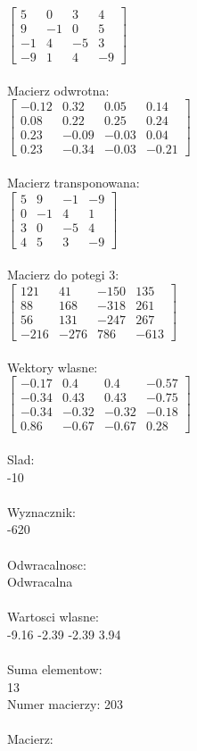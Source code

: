 \documentclass[a4paper,12pt]{article}
\begin{document}
$\begin{bmatrix} 5&0&3&4\\9&-1&0&5\\-1&4&-5&3\\-9&1&4&-9 \end{bmatrix}$
\\
\\
Macierz odwrotna:\\

$\begin{bmatrix} -0.12&0.32&0.05&0.14\\0.08&0.22&0.25&0.24\\0.23&-0.09&-0.03&0.04\\0.23&-0.34&-0.03&-0.21 \end{bmatrix}$
\\
\\
Macierz transponowana:\\

$\begin{bmatrix} 5&9&-1&-9\\0&-1&4&1\\3&0&-5&4\\4&5&3&-9 \end{bmatrix}$
\\
\\
Macierz do potegi 3:\\

$\begin{bmatrix} 121&41&-150&135\\88&168&-318&261\\56&131&-247&267\\-216&-276&786&-613 \end{bmatrix}$
\\
\\
Wektory wlasne:\\

$\begin{bmatrix} -0.17&0.4&0.4&-0.57\\-0.34&0.43&0.43&-0.75\\-0.34&-0.32&-0.32&-0.18\\0.86&-0.67&-0.67&0.28 \end{bmatrix}$
\\
\\
Slad:\\
-10
\\
\\
Wyznacznik:\\
-620
\\
\\
Odwracalnosc:\\
Odwracalna
\\
\\
Wartosci wlasne:\\
-9.16 -2.39 -2.39 3.94
\\
\\
Suma elementow:\\
13
\\
\newpage
Numer macierzy:
203
\\
\\
Macierz:\\
\end{document}
